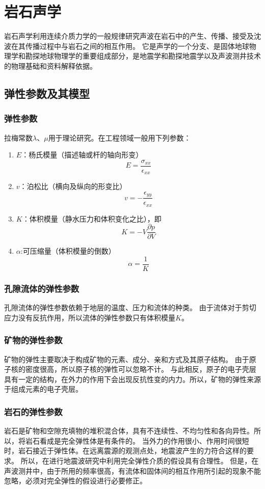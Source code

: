 \documentclass[hyperref,UTF-8,twoside]{ctexart}
\begin{document}
\section{岩石声学}
岩石声学利用连续介质力学的一般规律研究声波在岩石中的产生、传播、接受及沈波在其传播过程中与岩石之间的相互作用。
它是声学的一个分支、是固体地球物理学和勘探地球物理学的重要组成部分，是地震学和勘探地震学以及声波测井技术的物理基础和资料解释依据。
\subsection{弹性参数及其模型}
\subsubsection{弹性参数}
拉梅常数$\lambda$、$\mu$用于理论研究。在工程领域一般用下列参数：
\begin{enumerate}
\item $E$：杨氏模量（描述轴或杆的轴向形变）
$$E = \frac {\sigma_{xx} } {\epsilon_{xx}}$$
\item $v$：泊松比（横向及纵向的形变比）
$$v=-\frac{\epsilon_{yy}}{\epsilon_{xx}}$$
\item $K$：体积模量（静水压力和体积变化之比），即
$$K=-V\frac{\partial p}{\partial V}$$
\item $\alpha$:可压缩量（体积模量的倒数）
$$\alpha=\frac{1}{K}$$
\end{enumerate}
\subsubsection{孔隙流体的弹性参数}
孔隙流体的弹性参数依赖于地层的温度、压力和流体的种类。
由于流体对于剪切应力没有反抗作用，所以流体的弹性参数只有体积模量$K$。
\subsubsection{矿物的弹性参数}
矿物的弹性主要取决于构成矿物的元素、成分、亲和方式及其原子结构。
由于原子核的密度很高，所以原子核的弹性可以忽略不计。
与此相反，原子的电子壳层具有一定的结构，在外力的作用下会出现反抗性变的内力。所以，矿物的弹性来源于组成元素的电子壳层。
\subsubsection{岩石的弹性参数}
岩石是矿物和空隙充填物的堆积混合体，具有不连续性、不均匀性和各向异性。所以，将岩石看成是完全弹性体是有条件的。
当外力的作用很小、作用时间很短时，岩石接近于弹性体。在远离震源的观测点处，地震波产生的力符合这样的要求。
所以，在进行地震波研究中利用完全弹性介质的假设具有合理性。
但是，在声波测井中，由于所用的频率很高，有流体和固体间的相互作用所引起的现象不能忽略，必须对完全弹性的假设进行必要修正。
\end{document}
